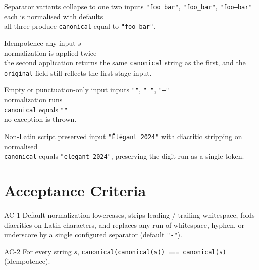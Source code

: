 \begin{scenario}{Separator variants collapse to one}
\Given two inputs \texttt{"foo bar"}, \texttt{"foo\_bar"}, \texttt{"foo--bar"} \\
\When each is normalised with defaults \\
\Then all three produce \texttt{canonical} equal to \texttt{"foo-bar"}.
\end{scenario}

\begin{scenario}{Idempotence}
\Given any input \(s\) \\
\When normalization is applied twice \\
\Then the second application returns the same \texttt{canonical} string as the first, and the \texttt{original} field still reflects the first-stage input.
\end{scenario}

\begin{scenario}{Empty or punctuation-only input}
\Given inputs \texttt{""}, \texttt{"   "}, \texttt{"---"} \\
\When normalization runs \\
\Then \texttt{canonical} equals \texttt{""} \\
\And no exception is thrown.
\end{scenario}

\begin{scenario}{Non-Latin script preserved}
\Given input \texttt{"\^{E}l\'{e}gant 2024"} with diacritic stripping on \\
\When normalised \\
\Then \texttt{canonical} equals \texttt{"elegant-2024"}, preserving the digit run as a single token.
\end{scenario}

\section{Acceptance Criteria}

\begin{ac}{AC-1}
Default normalization lowercases, strips leading / trailing whitespace, folds diacritics on Latin characters, and replaces any run of whitespace, hyphen, or underscore by a single configured separator (default \texttt{"-"}).
\end{ac}

\begin{ac}{AC-2}
For every string \(s\), \texttt{canonical(canonical(s)) === canonical(s)} (idempotence).
\end{ac}

